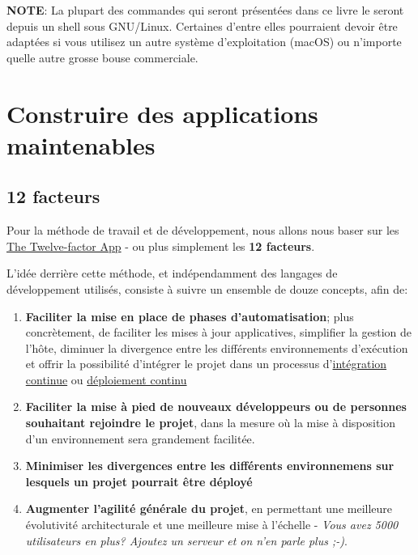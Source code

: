 \documentclass[11pt]{amsbook}
\newcommand{\admonition}[2]{\textbf{#1}: {#2}}
\begin{document}
\admonition{NOTE}{La plupart des commandes qui seront présentées dans ce livre le seront depuis un shell sous GNU/Linux. Certaines d’entre elles pourraient devoir être adaptées si vous utilisez un autre système d’exploitation (macOS) ou n’importe quelle autre grosse bouse commerciale.}
\hypertarget{x-construire-des-applications-maintenables}{\chapter{Construire des applications maintenables}}
\hypertarget{x-12-facteurs}{\section{12 facteurs}}
Pour la méthode de travail et de développement, nous allons nous baser sur les \href{https://12factor.net/fr/}{The Twelve-factor App} - ou plus simplement les \textbf{12 facteurs}.


L’idée derrière cette méthode, et indépendamment des langages de développement utilisés, consiste à suivre un ensemble de douze concepts, afin de:


\begin{enumerate}

\item{\textbf{Faciliter la mise en place de phases d’automatisation}; plus concrètement, de faciliter les mises à jour applicatives, simplifier la gestion de l’hôte, diminuer la divergence entre les différents environnements d’exécution et offrir la possibilité d’intégrer le projet dans un processus d’\href{https://en.wikipedia.org/wiki/Continuous_integration}{intégration continue} ou \href{https://en.wikipedia.org/wiki/Continuous_deployment}{déploiement continu}}

\item{\textbf{Faciliter la mise à pied de nouveaux développeurs ou de personnes souhaitant rejoindre le projet}, dans la mesure où la mise à disposition d’un environnement sera grandement facilitée.}

\item{\textbf{Minimiser les divergences entre les différents environnemens sur lesquels un projet pourrait être déployé}}

\item{\textbf{Augmenter l’agilité générale du projet}, en permettant une meilleure évolutivité architecturale et une meilleure mise à l’échelle - \emph{Vous avez 5000 utilisateurs en plus? Ajoutez un serveur et on n’en parle plus ;-)}.}

\end{enumerate}
\end{document}
